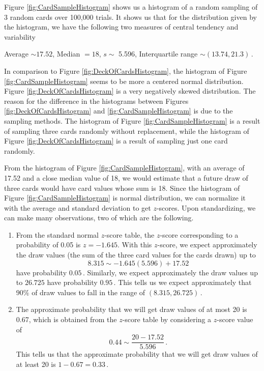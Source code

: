 \documentclass[12pt]{amsart}
\begin{document}
Figure \ref{fig:CardSampleHistogram} shows us a histogram of a random sampling of 3 random cards over 100,000 trials.  It shows us that for the distribution given by the histogram, we have the following two measures of central tendency and variability
\begin{center}
Average $\sim 17.52$, Median $= 18$, $s \sim$ 5.596, Interquartile range $\sim (13.74, 21.3)$\,.
\end{center}

In comparison to Figure \ref{fig:DeckOfCardsHistogram}, the histogram of Figure  \ref{fig:CardSampleHistogram} seems to be more a centered normal distribution.  Figure \ref{fig:DeckOfCardsHistogram} is a very negatively skewed distribution.  The reason for the difference in the histograms between Figures \ref{fig:DeckOfCardsHistogram} and  \ref{fig:CardSampleHistogram} is due to the sampling methods.  The histogram of Figure \ref{fig:CardSampleHistogram} is a result of sampling three cards randomly without replacement, while the histogram of Figure \ref{fig:DeckOfCardsHistogram} is a result of sampling just one card randomly.

From the histogram of Figure \ref{fig:CardSampleHistogram}, with an average of 17.52 and a close median value of 18, we would estimate that a future draw of three cards would have card values whose sum is 18.  Since the histogram of Figure \ref{fig:CardSampleHistogram} is normal distribution, we can normalize it with the average and standard deviation to get $z$-scores.  Upon standardizing, we can make many observations, two of which are the following.
\begin{enumerate}
\item  From the standard normal $z$-score table, the $z$-score corresponding to a probability of 0.05 is $z = -1.645$.  With this $z$-score, we expect approximately the draw values (the sum of the three card values for the cards drawn) up to
$$
8.315 \sim -1.645(5.596) + 17.52
$$
have probability $0.05$\,.  Similarly, we expect approximately the draw values up to $26.725$ have probability $0.95$\,.  This tells us we expect approximately that $90 \%$ of draw values to fall in the range of $(8.315, 26.725)$\,.
\item The approximate probability that we will get draw values of at most 20 is 0.67, which is obtained from the $z$-score table by considering a $z$-score value of 
$$
0.44 \sim \dfrac{20 - 17.52}{5.596}\,.
$$
This tells us that the approximate probability that we will get draw values of at least 20 is $1 - 0.67 = 0.33$\,.
\end{enumerate}
\end{document}
